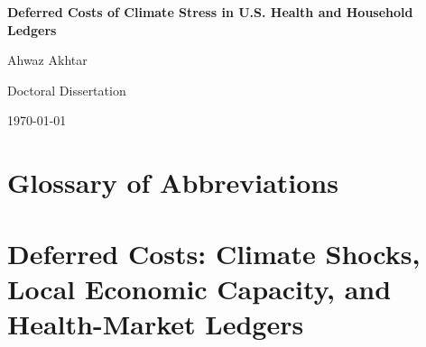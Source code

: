 \documentclass[a4paper,11pt]{report}
\begin{document}
\begin{titlepage}
\linespread{1}
\begin{center}
\vspace*{2cm}
\LARGE\textbf{Deferred Costs of Climate Stress in U.S. Health and Household Ledgers}

\vspace{0.6cm}
\Large Ahwaz Akhtar

\vspace{0.8cm}
\large Doctoral Dissertation

\vspace{0.4cm}
\today

\vspace{0.4cm}
\hrulefill
\vspace{0.4cm}

\end{center}

\noindent\hrulefill
\end{titlepage}

\singlespacing\tableofcontents\doublespacing
\clearpage
\chapter*{Glossary of Abbreviations}

\clearpage
{}
\chapter{Deferred Costs: Climate Shocks, Local Economic Capacity, and Health-Market Ledgers}
\end{document}
